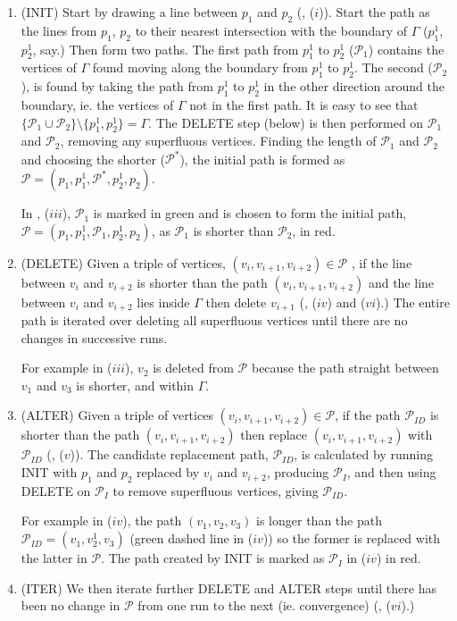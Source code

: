 \begin{enumerate}
\item (INIT) Start by drawing a line between $p_1$ and $p_2$ (, ($i$)). Start the path as the lines from $p_1$, $p_2$ to their nearest intersection with the boundary of $\Gamma$ ($p_1^1$, $p_2^1$, say.) Then form two paths. The first path from $p_1^1$ to $p_2^1$ ($\mathcal{P}_1$) contains the vertices of $\Gamma$ found moving along the boundary from $p_1^1$ to $p_2^1$. The second ($\mathcal{P}_2$), is found by taking the path from $p_1^1$ to $p_2^1$ in the other direction around the boundary, ie. the vertices of $\Gamma$ not in the first path. It is easy to see that $\{\mathcal{P}_1 \cup \mathcal{P}_2\} \setminus \{p_1^1, p_2^1\} = \Gamma$. The DELETE step (below) is then performed on $\mathcal{P}_1$ and $\mathcal{P}_2$, removing any superfluous vertices. Finding the length of $\mathcal{P}_1$ and $\mathcal{P}_2$ and choosing the shorter ($\mathcal{P^*}$), the initial path is formed as $\mathcal{P}=(p_1,p_1^1,\mathcal{P}^*,p_2^1,p_2)$. 

In , ($iii$), $\mathcal{P}_1$ is marked in green and is chosen to form the initial path, $\mathcal{P}=(p_1,p_1^1,\mathcal{P}_1,p_2^1,p_2)$, as $\mathcal{P}_1$ is shorter than $\mathcal{P}_2$, in red.

\item (DELETE) Given a triple of vertices, $(v_i, v_{i+1}, v_{i+2}) \in \mathcal{P}$ , if the line between $v_i$ and $v_{i+2}$ is shorter than the path $(v_i, v_{i+1}, v_{i+2})$ and the line between $v_i$ and $v_{i+2}$ lies inside $\Gamma$ then delete $v_{i+1}$ (, ($iv$) and ($vi$).) The entire path is iterated over deleting all superfluous vertices until there are no changes in successive runs. 

For example in  ($iii$), $v_2$ is deleted from $\mathcal{P}$ because the path straight between $v_1$ and $v_3$ is shorter, and within $\Gamma$.

\item (ALTER) Given a triple of vertices $(v_i, v_{i+1}, v_{i+2}) \in \mathcal{P}$, if the path $\mathcal{P}_{ID}$ is shorter than the path $(v_i, v_{i+1}, v_{i+2})$ then replace $(v_i, v_{i+1}, v_{i+2})$ with $\mathcal{P}_{ID}$ (, ($v$)). The candidate replacement path, $\mathcal{P}_{ID}$, is calculated by running INIT with $p_1$ and $p_2$ replaced by $v_i$ and $v_{i+2}$, producing $\mathcal{P}_I$, and then using DELETE on $\mathcal{P}_I$ to remove superfluous vertices, giving $\mathcal{P}_{ID}$.

For example in  ($iv$), the path $(v_1, v_2, v_3)$ is longer than the path $\mathcal{P}_{ID}=(v_1, v^1_2, v_3)$ (green dashed line in ($iv$)) so the former is replaced with the latter in $\mathcal{P}$. The path created by INIT is marked as $\mathcal{P}_{I}$ in  ($iv$) in red.

\item (ITER) We then iterate further DELETE and ALTER steps until there has been no change in $\mathcal{P}$ from one run to the next (ie. convergence) (, ($vi$).)
\end{enumerate}

